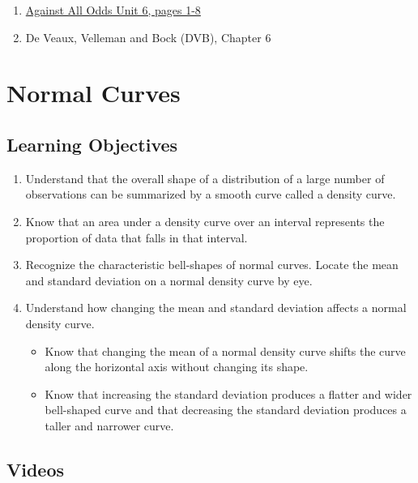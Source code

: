\documentclass[letterpaper,12pt,twoside,printwatermark=false]{pinp}
\providecommand{\tightlist}{%
  \setlength{\itemsep}{0pt}\setlength{\parskip}{0pt}}
\begin{document}
\begin{enumerate}
\item \href{https://www.learner.org/courses/againstallodds/pdfs/AgainstAllOdds_StudentGuide_Unit06.pdf#page=1}{Against All Odds Unit 6, pages 1-8}
\item De Veaux, Velleman and Bock (DVB), Chapter 6
\end{enumerate}

\hypertarget{normal-curves}{%
\section{Normal Curves}\label{normal-curves}}

\hypertarget{learning-objectives-2}{%
\subsection{Learning Objectives}\label{learning-objectives-2}}

\begin{enumerate}
\def\labelenumi{\arabic{enumi}.}
\tightlist
\item
  Understand that the overall shape of a distribution of a large number
  of observations can be summarized by a smooth curve called a density
  curve.
\item
  Know that an area under a density curve over an interval represents
  the proportion of data that falls in that interval.
\item
  Recognize the characteristic bell-shapes of normal curves. Locate the
  mean and standard deviation on a normal density curve by eye.
\item
  Understand how changing the mean and standard deviation affects a
  normal density curve.

  \begin{itemize}
  \tightlist
  \item
    Know that changing the mean of a normal density curve shifts the
    curve along the horizontal axis without changing its shape.
  \item
    Know that increasing the standard deviation produces a flatter and
    wider bell-shaped curve and that decreasing the standard deviation
    produces a taller and narrower curve.
  \end{itemize}
\end{enumerate}

\hypertarget{videos-2}{%
\subsection{Videos}\label{videos-2}}
\end{document}
